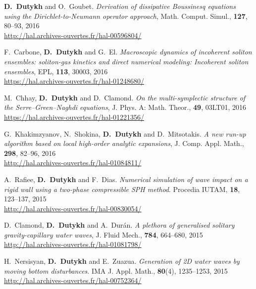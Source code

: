 \begin{etaremune}
  \item \textbf{D.~Dutykh} and O.~Goubet. \textit{Derivation of dissipative Boussinesq equations using the Dirichlet-to-Neumann operator approach}, Math. Comput. Simul., \textbf{127}, 80--93, 2016 \\ %
  \url{http://hal.archives-ouvertes.fr/hal-00596804/}
  
  \item F.~Carbone, \textbf{D.~Dutykh} and G.~El. \textit{Macroscopic dynamics of incoherent soliton ensembles: soliton-gas kinetics and direct numerical modeling: Incoherent soliton ensembles}, EPL, \textbf{113}, 30003, 2016 \\ %
  \url{https://hal.archives-ouvertes.fr/hal-01248680/}
  
  \item M.~Chhay, \textbf{D.~Dutykh} and D.~Clamond. \textit{On the multi-symplectic structure of the Serre--Green--Naghdi equations}, J. Phys. A: Math. Theor., \textbf{49}, 03LT01, 2016 \\ %
  \url{https://hal.archives-ouvertes.fr/hal-01221356/}
  
  \item G.~Khakimzyanov, N.~Shokina, \textbf{D.~Dutykh} and D.~Mitsotakis. \textit{A new run-up algorithm based on local high-order analytic expansions}, J. Comp. Appl. Math., \textbf{298}, 82--96, 2016 \\ %
  \url{http://hal.archives-ouvertes.fr/hal-01084811/}
  
  
  \item A.~Rafiee, \textbf{D.~Dutykh} and F.~Dias. \textit{Numerical simulation of wave impact on a rigid wall using a two-phase compressible SPH method}. Procedia IUTAM, \textbf{18}, 123--137, 2015 \\ %
  \url{http://hal.archives-ouvertes.fr/hal-00830054/}

  \item D.~Clamond, \textbf{D.~Dutykh} and A.~Dur\'an. \textit{A plethora of generalised solitary gravity-capillary water waves}, J. Fluid Mech., \textbf{784}, 664--680, 2015 \\ %
  \url{http://hal.archives-ouvertes.fr/hal-01081798/}
  
  \item H.~Nersisyan, \textbf{D.~Dutykh} and E.~Zuazua. \textit{Generation of 2D water waves by moving bottom disturbances}. IMA J. Appl. Math., \textbf{80}(4), 1235--1253, 2015 \\ %
  \url{http://hal.archives-ouvertes.fr/hal-00752364/}
  

\end{etaremune}
